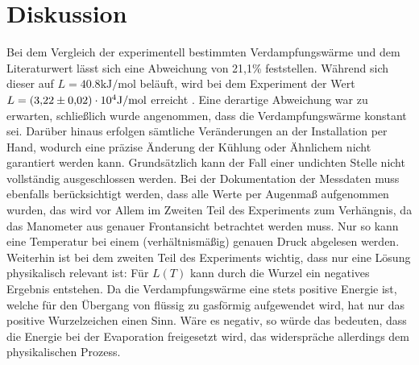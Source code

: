 \section{Diskussion}
\label{sec:Diskussion}

Bei dem Vergleich der experimentell bestimmten Verdampfungswärme und dem
Literaturwert lässt sich eine Abweichung von 21,1\% feststellen. Während 
sich dieser auf $L = \num{40.8} \si{\kilo\joule\per\mole}$ beläuft, wird
bei dem Experiment der Wert $L = \num{3.22 +- 0.02 e4} \unit{\joule\per\mol}$ 
erreicht \cite{verdampfungswaerme}.
\noindent Eine derartige Abweichung war zu erwarten, schließlich wurde 
angenommen, dass die Verdampfungswärme konstant sei. Darüber hinaus erfolgen 
sämtliche Veränderungen an der Installation per Hand, wodurch eine präzise 
Änderung der Kühlung oder Ähnlichem nicht garantiert werden kann. Grundsätzlich 
kann der Fall einer undichten Stelle nicht vollständig ausgeschlossen werden.
Bei der Dokumentation der Messdaten muss ebenfalls berücksichtigt werden, dass 
alle Werte per Augenmaß aufgenommen wurden, das wird vor Allem im Zweiten Teil 
des Experiments zum Verhängnis, da das Manometer aus genauer Frontansicht 
betrachtet werden muss. Nur so kann eine Temperatur bei einem (verhältnismäßig)
genauen Druck abgelesen werden. Weiterhin ist bei dem zweiten Teil des Experiments 
wichtig, dass nur eine Lösung physikalisch relevant ist: Für $L(T)$ kann 
durch die Wurzel ein negatives Ergebnis entstehen. Da die Verdampfungswärme 
eine stets positive Energie ist, welche für den Übergang von flüssig zu 
gasförmig  aufgewendet wird, hat nur das positive Wurzelzeichen einen Sinn. 
Wäre es negativ, so würde das bedeuten, dass die Energie bei der Evaporation 
freigesetzt wird, das widerspräche allerdings dem physikalischen Prozess.
